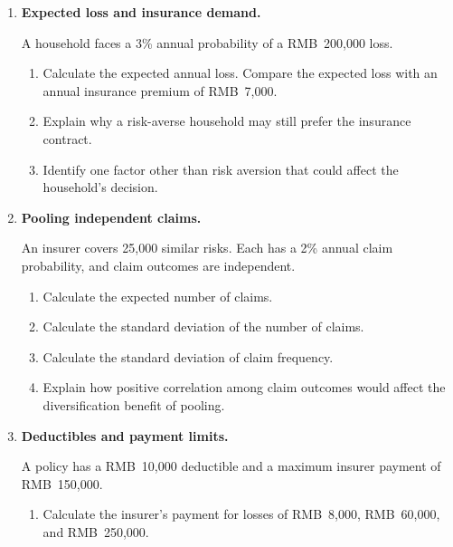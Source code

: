 \begin{enumerate}

\item \textbf{Expected loss and insurance demand.}

A household faces a 3\% annual probability of a RMB~200,000 loss.

\begin{enumerate}

\item Calculate the expected annual loss. Compare the expected loss with an annual insurance premium of RMB~7,000.

\item Explain why a risk-averse household may still prefer the insurance contract.

\item Identify one factor other than risk aversion that could affect the household's decision.

\end{enumerate}

\item \textbf{Pooling independent claims.}

An insurer covers 25,000 similar risks. Each has a 2\% annual claim probability, and claim outcomes are independent.

\begin{enumerate}

\item Calculate the expected number of claims.

\item Calculate the standard deviation of the number of claims.

\item Calculate the standard deviation of claim frequency.

\item Explain how positive correlation among claim outcomes would affect the diversification benefit of pooling.

\end{enumerate}

\item \textbf{Deductibles and payment limits.}

A policy has a RMB~10,000 deductible and a maximum insurer payment of RMB~150,000.

\begin{enumerate}

\item Calculate the insurer's payment for losses of RMB~8,000, RMB~60,000, and RMB~250,000.


\end{enumerate}
\end{enumerate}
